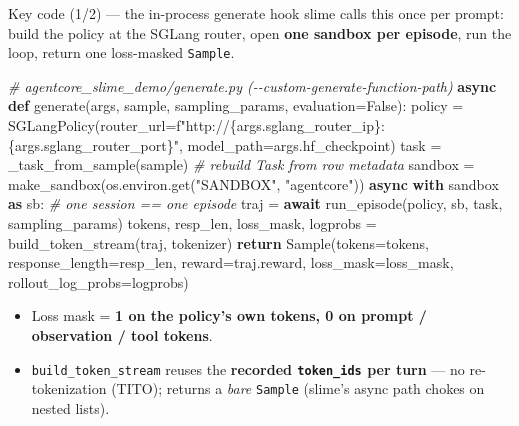 \documentclass[
  10pt,
  ignorenonframetext,
  aspectratio=169,
  t]{beamer}
\newenvironment{Shaded}{}{}
\newcommand{\CommentTok}[1]{\textcolor[rgb]{0.38,0.63,0.69}{\textit{#1}}}
\newcommand{\ControlFlowTok}[1]{\textcolor[rgb]{0.00,0.44,0.13}{\textbf{#1}}}
\newcommand{\ImportTok}[1]{\textcolor[rgb]{0.00,0.50,0.00}{\textbf{#1}}}
\newcommand{\KeywordTok}[1]{\textcolor[rgb]{0.00,0.44,0.13}{\textbf{#1}}}
\newcommand{\NormalTok}[1]{#1}
\newcommand{\OperatorTok}[1]{\textcolor[rgb]{0.40,0.40,0.40}{#1}}
\newcommand{\SpecialCharTok}[1]{\textcolor[rgb]{0.25,0.44,0.63}{#1}}
\newcommand{\SpecialStringTok}[1]{\textcolor[rgb]{0.73,0.40,0.53}{#1}}
\newcommand{\StringTok}[1]{\textcolor[rgb]{0.25,0.44,0.63}{#1}}
\newcommand{\VariableTok}[1]{\textcolor[rgb]{0.10,0.09,0.49}{#1}}
\providecommand{\tightlist}{%
  \setlength{\itemsep}{0pt}\setlength{\parskip}{0pt}}
\begin{document}
\begin{frame}{Key code (1/2) --- the in-process generate hook}
\protect\hypertarget{key-code-12-the-in-process-generate-hook}{}
slime calls this once per prompt: build the policy at the SGLang router,
open \textbf{one sandbox per episode}, run the loop, return one
loss-masked \texttt{Sample}.

\begin{Shaded}
\begin{Highlighting}[]
\CommentTok{\# agentcore\_slime\_demo/generate.py   ({-}{-}custom{-}generate{-}function{-}path)}
\ControlFlowTok{async} \KeywordTok{def}\NormalTok{ generate(args, sample, sampling\_params, evaluation}\OperatorTok{=}\VariableTok{False}\NormalTok{):}
\NormalTok{    policy  }\OperatorTok{=}\NormalTok{ SGLangPolicy(router\_url}\OperatorTok{=}\SpecialStringTok{f"http://}\SpecialCharTok{\{}\NormalTok{args}\SpecialCharTok{.}\NormalTok{sglang\_router\_ip}\SpecialCharTok{\}}\SpecialStringTok{:}\SpecialCharTok{\{}\NormalTok{args}\SpecialCharTok{.}\NormalTok{sglang\_router\_port}\SpecialCharTok{\}}\SpecialStringTok{"}\NormalTok{,}
\NormalTok{                           model\_path}\OperatorTok{=}\NormalTok{args.hf\_checkpoint)}
\NormalTok{    task    }\OperatorTok{=}\NormalTok{ \_task\_from\_sample(sample)            }\CommentTok{\# rebuild Task from row metadata}
\NormalTok{    sandbox }\OperatorTok{=}\NormalTok{ make\_sandbox(os.environ.get(}\StringTok{"SANDBOX"}\NormalTok{, }\StringTok{"agentcore"}\NormalTok{))}
    \ControlFlowTok{async} \ControlFlowTok{with}\NormalTok{ sandbox }\ImportTok{as}\NormalTok{ sb:                      }\CommentTok{\# one session == one episode}
\NormalTok{        traj }\OperatorTok{=} \ControlFlowTok{await}\NormalTok{ run\_episode(policy, sb, task, sampling\_params)}
\NormalTok{    tokens, resp\_len, loss\_mask, logprobs }\OperatorTok{=}\NormalTok{ build\_token\_stream(traj, tokenizer)}
    \ControlFlowTok{return}\NormalTok{ Sample(tokens}\OperatorTok{=}\NormalTok{tokens, response\_length}\OperatorTok{=}\NormalTok{resp\_len, reward}\OperatorTok{=}\NormalTok{traj.reward,}
\NormalTok{                  loss\_mask}\OperatorTok{=}\NormalTok{loss\_mask, rollout\_log\_probs}\OperatorTok{=}\NormalTok{logprobs)}
\end{Highlighting}
\end{Shaded}

\begin{itemize}
\tightlist
\item
  Loss mask = \textbf{1 on the policy's own tokens, 0 on prompt /
  observation / tool tokens}.
\item
  \texttt{build\_token\_stream} reuses the \textbf{recorded
  \texttt{token\_ids} per turn} --- no re-tokenization (TITO); returns a
  \emph{bare} \texttt{Sample} (slime's async path chokes on nested
  lists).
\end{itemize}
\end{frame}
\end{document}
